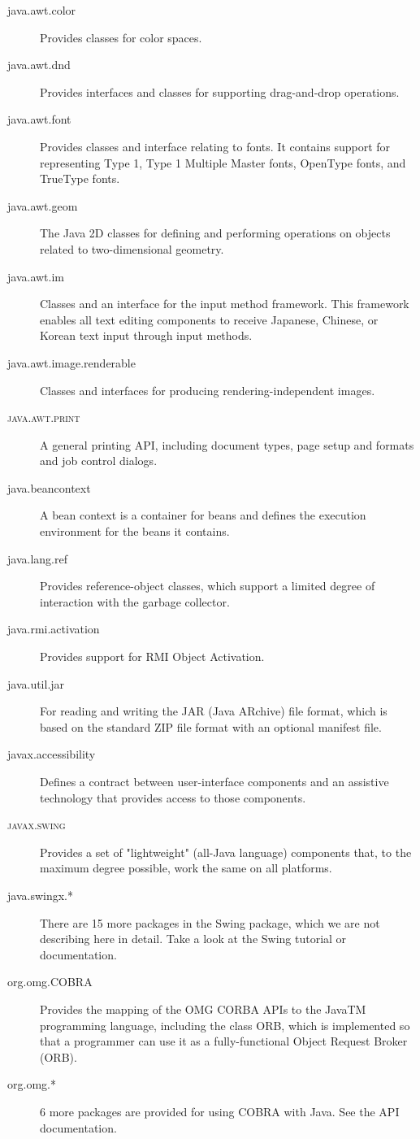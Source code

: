 \begin{description}
\item[java.awt.color] Provides classes for color spaces.
\item[java.awt.dnd] Provides interfaces and classes for supporting drag-and-drop operations.
\item[java.awt.font] Provides classes and interface relating to fonts. It contains support for representing Type 1, Type 1 Multiple Master fonts,
OpenType fonts, and TrueType fonts. 
\item[java.awt.geom] The Java 2D classes for defining and performing operations on objects related to two-dimensional geometry. 
\item[java.awt.im] Classes and an interface for the input method framework. This framework enables all text editing components to receive Japanese, Chinese, or Korean text input through input methods. 
\item[java.awt.image.renderable] Classes and interfaces for producing rendering-independent images.
\item[\textsc{java.awt.print}] A general printing API, including document types, 
  page setup and formats and job control dialogs.
\item[java.beancontext] A bean context is a container for beans and defines the execution environment for the beans it contains.
\item[java.lang.ref] Provides reference-object classes, which support a limited degree of interaction with the garbage collector.
\item[java.rmi.activation] Provides support for RMI Object Activation.
\item[java.util.jar] For reading and writing the JAR (Java ARchive) file format, which is based on the standard ZIP file format with an optional manifest file. 
\item[javax.accessibility] Defines a contract between user-interface components and an assistive technology that provides access to those components. 
\item[\textsc{javax.swing}] Provides a set of "lightweight" (all-Java language) components that, to the maximum degree possible, work the same on all
platforms. 
\item[java.swingx.*] There are 15 more packages in the Swing package, which we are not describing here in detail. Take a look at the Swing tutorial or documentation.
\item[org.omg.COBRA] Provides the mapping of the OMG CORBA APIs to the JavaTM programming language, including the class ORB, which is implemented so that a programmer can use it as a fully-functional Object Request Broker (ORB).
\item[org.omg.*] 6 more packages are provided for using COBRA with Java. See the API documentation.
\end{description}

